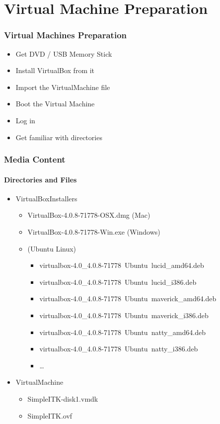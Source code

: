 \section{Virtual Machine Preparation}


\begin{frame}
\frametitle{Virtual Machines Preparation}
\begin{itemize}
\item Get DVD / USB Memory Stick
\item Install VirtualBox from it
\item Import the VirtualMachine file
\item Boot the Virtual Machine
\item Log in
\item Get familiar with directories
\end{itemize}
\end{frame}

\begin{frame}
\frametitle{Media Content}
\framesubtitle{Directories and Files}
\begin{itemize}
\item VirtualBoxInstallers
\begin{itemize}
\item VirtualBox-4.0.8-71778-OSX.dmg (Mac)
\item VirtualBox-4.0.8-71778-Win.exe (Windows)
\item (Ubuntu Linux)
\begin{itemize}
\item virtualbox-4.0\_4.0.8-71778~Ubuntu~lucid\_amd64.deb
\item virtualbox-4.0\_4.0.8-71778~Ubuntu~lucid\_i386.deb
\item virtualbox-4.0\_4.0.8-71778~Ubuntu~maverick\_amd64.deb
\item virtualbox-4.0\_4.0.8-71778~Ubuntu~maverick\_i386.deb
\item virtualbox-4.0\_4.0.8-71778~Ubuntu~natty\_amd64.deb
\item virtualbox-4.0\_4.0.8-71778~Ubuntu~natty\_i386.deb
\item \ldots
\end{itemize}
\end{itemize}
\item VirtualMachine
\begin{itemize}
\item  SimpleITK-disk1.vmdk
\item  SimpleITK.ovf
\end{itemize}
\end{itemize}
\end{frame}

